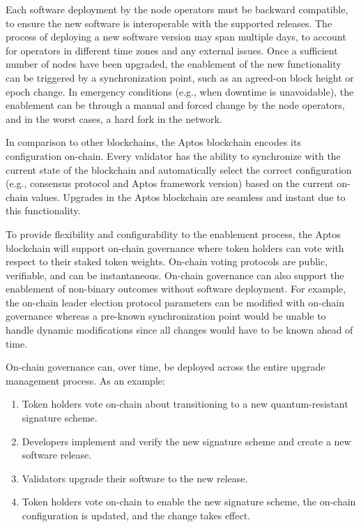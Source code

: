 \documentclass{article}
\begin{document}
Each software deployment by the node operators must be backward compatible, to ensure the new software is interoperable with the supported releases. The process of deploying a new software version may span multiple days, to account for operators in different time zones and any external issues. Once a sufficient number of nodes have been upgraded, the enablement of the new functionality can be triggered by a synchronization point, such as an agreed-on block height or epoch change. In emergency conditions (e.g., when downtime is unavoidable), the enablement can be through a manual and forced change by the node operators, and in the worst cases, a hard fork in the network.

In comparison to other blockchains, the Aptos blockchain encodes its configuration on-chain. Every validator has the ability to synchronize with the current state of the blockchain and automatically select the correct configuration (e.g., consensus protocol and Aptos framework version) based on the current on-chain values. Upgrades in the Aptos blockchain are seamless and instant due to this functionality.

To provide flexibility and configurability to the enablement process, the Aptos blockchain will support on-chain governance where token holders can vote with respect to their staked token weights. On-chain voting protocols are public, verifiable, and can be instantaneous. On-chain governance can also support the enablement of non-binary outcomes without software deployment. For example, the on-chain leader election protocol parameters can be modified with on-chain governance whereas a pre-known synchronization point would be unable to handle dynamic modifications since all changes would have to be known ahead of time.

On-chain governance can, over time, be deployed across the entire upgrade management process. As an example:
\begin{enumerate}
\item Token holders vote on-chain about transitioning to a new quantum-resistant signature scheme.
\item Developers implement and verify the new signature scheme and create a new software release.
\item Validators upgrade their software to the new release.
\item Token holders vote on-chain to enable the new signature scheme, the on-chain configuration is updated, and the change takes effect.
\end{enumerate}
\end{document}
